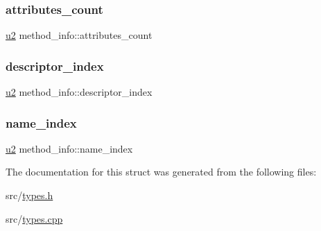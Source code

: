 \mbox{\label{structmethod__info_ad9e5e1e2fc850806addadd6deab8565d}} 
\subsubsection{\texorpdfstring{attributes\+\_\+count}{attributes\_count}}
{\footnotesize\ttfamily \hyperlink{types_8h_ae676e9207f57fb921dca7366b2f59c53}{u2} method\+\_\+info\+::attributes\+\_\+count}

\mbox{\label{structmethod__info_a7713103e0c8d060630ad62774fb9be37}} 
\subsubsection{\texorpdfstring{descriptor\+\_\+index}{descriptor\_index}}
{\footnotesize\ttfamily \hyperlink{types_8h_ae676e9207f57fb921dca7366b2f59c53}{u2} method\+\_\+info\+::descriptor\+\_\+index}

\mbox{\label{structmethod__info_ab91d62d0658b77bba83f6bb685e3bbb9}} 
\subsubsection{\texorpdfstring{name\+\_\+index}{name\_index}}
{\footnotesize\ttfamily \hyperlink{types_8h_ae676e9207f57fb921dca7366b2f59c53}{u2} method\+\_\+info\+::name\+\_\+index}



The documentation for this struct was generated from the following files\+:\begin{DoxyCompactItemize}
\item 
src/\hyperlink{types_8h}{types.\+h}\item 
src/\hyperlink{types_8cpp}{types.\+cpp}\end{DoxyCompactItemize}
